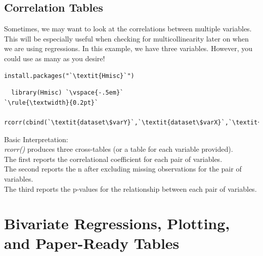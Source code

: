 \documentclass[12pt,letterpaper]{article}
\newcommand{\ind}{\phantom{AA}}
\begin{document}
\vspace{-.75em}

\subsection{Correlation Tables}
Sometimes, we may want to look at the correlations between multiple variables. This will be especially useful when checking for multicollinearity later on when we are using regressions. In this example, we have three variables. However, you could use as many as you desire!
\begin{tcolorbox}[title = Correlation Table]
\begin{lstlisting}[frameround = t t t t, backgroundcolor = \color{lightgray}]
  install.packages("`\textit{Hmisc}`")
\end{lstlisting}
\begin{lstlisting}
  library(Hmisc) `\vspace{-.5em}`
`\rule{\textwidth}{0.2pt}`
  rcorr(cbind(`\textit{dataset\$varY}`,`\textit{dataset\$varX}`,`\textit{dataset\$varZ}`))
\end{lstlisting}
Basic Interpretation:\\
\ind \emph{rcorr()} produces three cross-tables (or a table for each variable provided).\\
\ind The first reports the correlational coefficient for each pair of variables. \\ 
\ind The second reports the n after excluding missing observations for the pair of \ind \ind variables. \\ 
\ind The third reports the p-values for the relationship between each pair of variables.
\end{tcolorbox}


\newpage

\section{Bivariate Regressions, Plotting, and Paper-Ready Tables}

\end{document}
